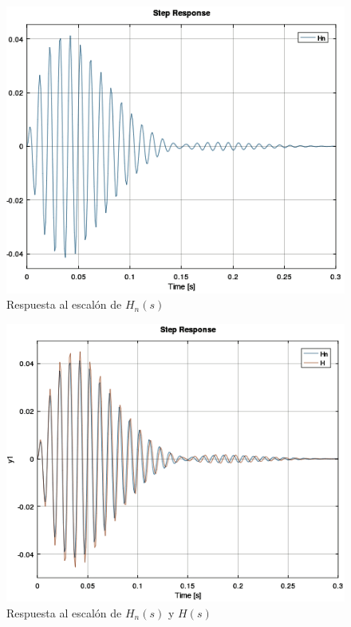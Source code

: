\documentclass[11pt,a4paper]{report}
\begin{document}
\vspace{10 mm}

\begin{figure}[h!]
\centering
\includegraphics[scale=0.7]{RtaEscalonN.png}
\caption{Respuesta al escalón de $H_{n}(s)$}
\end{figure}
\clearpage

\begin{figure}[h!]
\centering
\includegraphics[scale=0.7]{RtaEscalonComp.png}
\caption{Respuesta al escalón de $H_{n}(s)$ y $H(s)$}
\end{figure}
\end{document}

